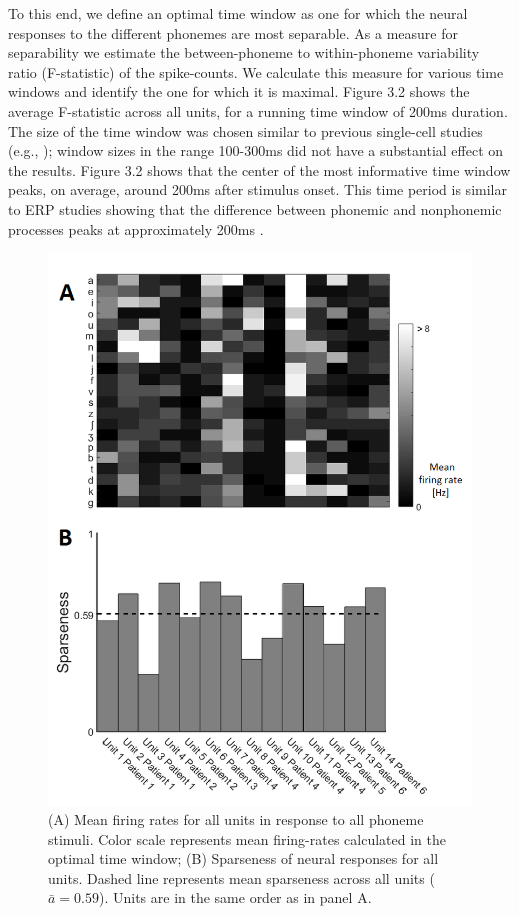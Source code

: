 To this end, we define an optimal time window as one for which the neural responses to the different phonemes are most separable. As a measure for separability we estimate the between-phoneme to within-phoneme variability ratio (F-statistic) of the spike-counts. We calculate this measure for various time windows and identify the one for which it is maximal. Figure 3.2 shows the average F-statistic across all units, for a running time window of 200ms duration. The size of the time window was chosen similar to previous single-cell studies (e.g., \citealp{chan2013speech}); window sizes in the range 100-300ms did not have a substantial effect on the results. Figure 3.2 shows that the center of the most informative time window peaks, on average, around 200ms after stimulus onset. This time period is similar to ERP studies showing that the difference between phonemic and nonphonemic processes peaks at approximately 200ms \citep{liebenthal2010specialization}.

\begin{figure}[H]
\vspace{.3in}
\includegraphics[width=\linewidth]{Figures/Ch3/ch3_fig3.png}
\caption{(A) Mean firing rates for all units in response to all phoneme stimuli. Color scale represents mean firing-rates calculated in the optimal time window; (B) Sparseness of neural responses for all units. Dashed line represents mean sparseness across all units ($\bar{a}=0.59$). Units are in the same order as in panel A.}
\end{figure}

